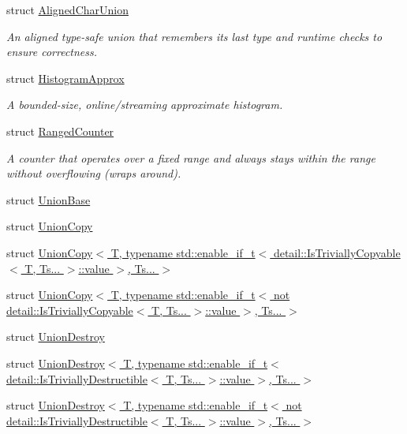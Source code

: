 \begin{DoxyCompactItemize}
\item 
struct \hyperlink{structvt_1_1util_1_1adt_1_1_aligned_char_union}{Aligned\+Char\+Union}
\begin{DoxyCompactList}\small\item\em An aligned type-\/safe union that remembers its last type and runtime checks to ensure correctness. \end{DoxyCompactList}\item 
struct \hyperlink{structvt_1_1util_1_1adt_1_1_histogram_approx}{Histogram\+Approx}
\begin{DoxyCompactList}\small\item\em A bounded-\/size, online/streaming approximate histogram. \end{DoxyCompactList}\item 
struct \hyperlink{structvt_1_1util_1_1adt_1_1_ranged_counter}{Ranged\+Counter}
\begin{DoxyCompactList}\small\item\em A counter that operates over a fixed range and always stays within the range without overflowing (wraps around). \end{DoxyCompactList}\item 
struct \hyperlink{structvt_1_1util_1_1adt_1_1_union_base}{Union\+Base}
\item 
struct \hyperlink{structvt_1_1util_1_1adt_1_1_union_copy}{Union\+Copy}
\item 
struct \hyperlink{structvt_1_1util_1_1adt_1_1_union_copy_3_01_t_00_01typename_01std_1_1enable__if__t_3_01detail_1_39951ca88dc847bbf698c46d828c8188}{Union\+Copy$<$ T, typename std\+::enable\+\_\+if\+\_\+t$<$ detail\+::\+Is\+Trivially\+Copyable$<$ T, Ts... $>$\+::value $>$, Ts... $>$}
\item 
struct \hyperlink{structvt_1_1util_1_1adt_1_1_union_copy_3_01_t_00_01typename_01std_1_1enable__if__t_3_01not_01det4a1e3b5522a7a77cb5d4fb8991a6197b}{Union\+Copy$<$ T, typename std\+::enable\+\_\+if\+\_\+t$<$ not detail\+::\+Is\+Trivially\+Copyable$<$ T, Ts... $>$\+::value $>$, Ts... $>$}
\item 
struct \hyperlink{structvt_1_1util_1_1adt_1_1_union_destroy}{Union\+Destroy}
\item 
struct \hyperlink{structvt_1_1util_1_1adt_1_1_union_destroy_3_01_t_00_01typename_01std_1_1enable__if__t_3_01detail42179a636679a7a81522739bdddb7210}{Union\+Destroy$<$ T, typename std\+::enable\+\_\+if\+\_\+t$<$ detail\+::\+Is\+Trivially\+Destructible$<$ T, Ts... $>$\+::value $>$, Ts... $>$}
\item 
struct \hyperlink{structvt_1_1util_1_1adt_1_1_union_destroy_3_01_t_00_01typename_01std_1_1enable__if__t_3_01not_0117947c5b8b44b7d9f4a4df27d8795277}{Union\+Destroy$<$ T, typename std\+::enable\+\_\+if\+\_\+t$<$ not detail\+::\+Is\+Trivially\+Destructible$<$ T, Ts... $>$\+::value $>$, Ts... $>$}
\end{DoxyCompactItemize}
